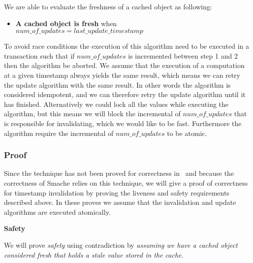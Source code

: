 We are able to evaluate the freshness of a cached object as following:

\begin{itemize}
  \item \textbf{A cached object is fresh} when\\$num\_of\_updates = last\_update\_timestamp$
\end{itemize}

To avoid race conditions the execution of this algorithm need to be executed in a transaction such that if $num\_of\_updates$ is incremented between step 1 and 2 then the algorithm be aborted. We assume that the execution of a computation at a given timestamp always yields the same result, which means we can retry the update algorithm with the same result. In other words the algorithm is considered idempotent, and we can therefore retry the update algorithm until it has finished. Alternatively we could lock all the values while executing the algorithm, but this means we will block the incremental of $num\_of\_updates$ that is responsible for invalidating, which we would like to be fast.
Furthermore the algorithm require the incremental of $num\_of\_updates$ to be atomic.

\subsubsection{Proof}
\label{subsubsec:proof}

Since the technique has not been proved for correctness in~\cite{paper:ibm-extended} and because the correctness of Smache relies on this technique, we will give a proof of correctness for timestamp invalidation by proving the liveness and safety requirements described above. In these proves we assume that the invalidation and update algorithms are executed atomically.

\textbf{Safety}

We will prove \emph{safety} using contradiction by \emph{assuming we have a cached object considered fresh that holds a stale value stored in the cache}.

